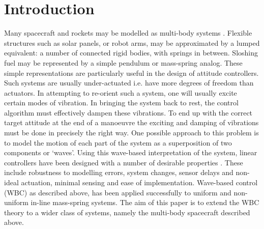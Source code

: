 \documentclass{mbd_fullpaper}
\begin{document}
\section{Introduction}
Many spacecraft and rockets may be modelled as multi-body systems \cite{Kane1980}.
Flexible structures such as solar panels, or robot arms, may be approximated by a lumped equivalent: a number of connected rigid bodies, with springs in between.
Sloshing fuel may be represented by a simple pendulum or mass-spring analog.
These simple representations are particularly useful in the design of attitude controllers.
Such systems are usually under-actuated i.e. have more degrees of freedom than actuators.
In attempting to re-orient such a system, one will usually excite certain modes of vibration.
In bringing the system back to rest, the control algorithm must effectively dampen these vibrations.
To end up with the correct target attitude at the end of a manoeuvre the exciting and damping of vibrations must be done in precisely the right way.
One possible approach to this problem is to model the motion of each part of the system as a superposition of two components or `waves'.
Using this wave-based interpretation of the system, linear controllers have been designed with a number of desirable properties \cite{Connor2005}. 
These include robustness to modelling errors, system changes, sensor delays and non-ideal actuation, minimal sensing and ease of implementation.
Wave-based control (WBC) as described above, has been applied successfully to uniform and non-uniform in-line mass-spring systems.
The aim of this paper is to extend the WBC theory to a wider class of systems, namely the multi-body spacecraft described above. 
\end{document}
